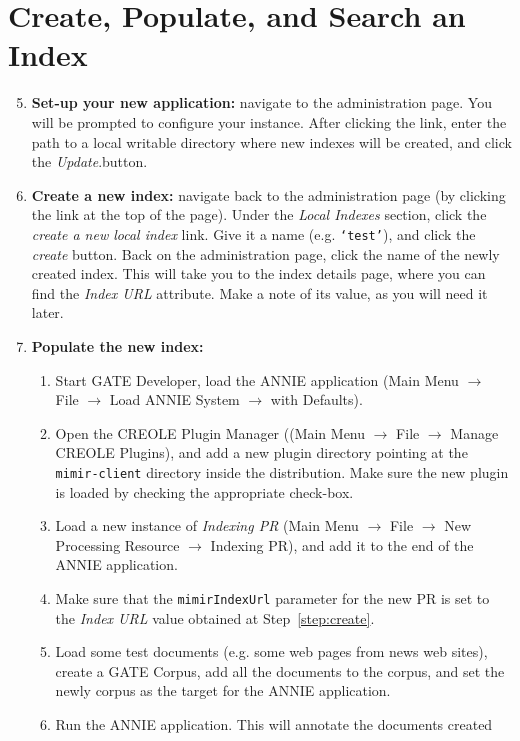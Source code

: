 \section{Create, Populate, and Search an Index}
%
\begin{enumerate}
\setcounter{enumi}{4}
  \item {\bf Set-up your new \Mimir{} application:}
  navigate to the administration page. You will be prompted to configure your \Mimir{} instance.
  After clicking the link, enter the path to a local writable directory
  where new indexes will be created, and click the {\em Update}.button.
  \item \label{step:create} {\bf Create a new index:} navigate back to the
  administration page (by clicking the link at the top of the page). Under the {\em Local Indexes}
  section, click the {\em create a new local index} link. Give it a name (e.g.
  {\tt `test'}), and click the {\em create} button. Back on the administration
  page, click the name of the newly created index. This will take you to the
  index details page, where you can find the {\em Index URL} attribute. Make a
  note of its value, as you will need it later.
  \item {\bf Populate the new index:} 
  \begin{enumerate}
    \item Start GATE Developer, load the ANNIE application (Main Menu 
    $\rightarrow$ File $\rightarrow$ Load ANNIE System $\rightarrow$ with
    Defaults).
    \item Open the CREOLE Plugin Manager ((Main Menu $\rightarrow$ File
    $\rightarrow$ Manage CREOLE Plugins), and add a new plugin directory
    pointing at the {\tt mimir-client} directory inside the \Mimir{}
    distribution. Make sure the new plugin is loaded by checking the
    appropriate check-box.
    \item Load a new instance of {\em \Mimir{} Indexing PR} (Main Menu
    $\rightarrow$ File $\rightarrow$ New Processing Resource $\rightarrow$
    \Mimir{} Indexing PR), and add it to the end of the ANNIE application.
    \item Make sure that the {\tt mimirIndexUrl} parameter for the new PR is set
    to the {\em Index URL} value obtained at Step~\ref{step:create}.
    \item Load some test documents (e.g. some web pages from news web sites),
    create a GATE Corpus, add all the documents to the corpus, and set the
    newly corpus as the target for the ANNIE application.
    \item Run the ANNIE application. This will annotate the documents created

\end{enumerate}
\end{enumerate}
